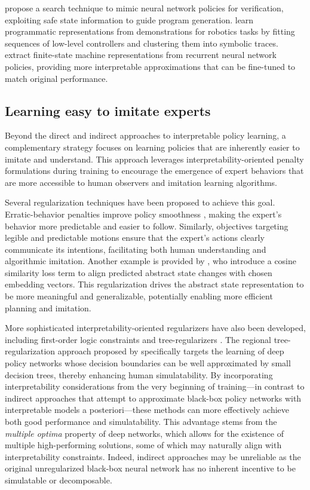 \cite{zhu_inductive_2019} propose a search technique to mimic neural network policies for verification, exploiting safe state information to guide program generation. \cite{burke_explanation_2019} learn programmatic representations from demonstrations for robotics tasks by fitting sequences of low-level controllers and clustering them into symbolic traces. \cite{Koul_learning_2019} extract finite-state machine representations from recurrent neural network policies, providing more interpretable approximations that can be fine-tuned to match original performance.

\subsection{Learning easy to imitate experts}

Beyond the direct and indirect approaches to interpretable policy learning, a complementary strategy focuses on learning policies that are inherently easier to imitate and understand. This approach leverages interpretability-oriented penalty formulations during training to encourage the emergence of expert behaviors that are more accessible to human observers and imitation learning algorithms.

Several regularization techniques have been proposed to achieve this goal. Erratic-behavior penalties improve policy smoothness \citep{jia_advanced_2019}, making the expert's behavior more predictable and easier to follow. Similarly, objectives targeting legible and predictable motions \citep{dragan_legibility_2013} ensure that the expert's actions clearly communicate its intentions, facilitating both human understanding and algorithmic imitation. Another example is provided by \cite{francois-lavet_combined_2019}, who introduce a cosine similarity loss term to align predicted abstract state changes with chosen embedding vectors. This regularization drives the abstract state representation to be more meaningful and generalizable, potentially enabling more efficient planning and imitation.

More sophisticated interpretability-oriented regularizers have also been developed, including first-order logic constraints \citep{serafini_logic_2016} and tree-regularizers \citep{wu_optimizing_2019}. The regional tree-regularization approach proposed by \cite{wu_optimizing_2019} specifically targets the learning of deep policy networks whose decision boundaries can be well approximated by small decision trees, thereby enhancing human simulatability. By incorporating interpretability considerations from the very beginning of training---in contrast to indirect approaches that attempt to approximate black-box policy networks with interpretable models a posteriori---these methods can more effectively achieve both good performance and simulatability. This advantage stems from the \textit{multiple optima} property of deep networks, which allows for the existence of multiple high-performing solutions, some of which may naturally align with interpretability constraints. Indeed, indirect approaches may be unreliable as the original unregularized black-box neural network has no inherent incentive to be simulatable or decomposable.

